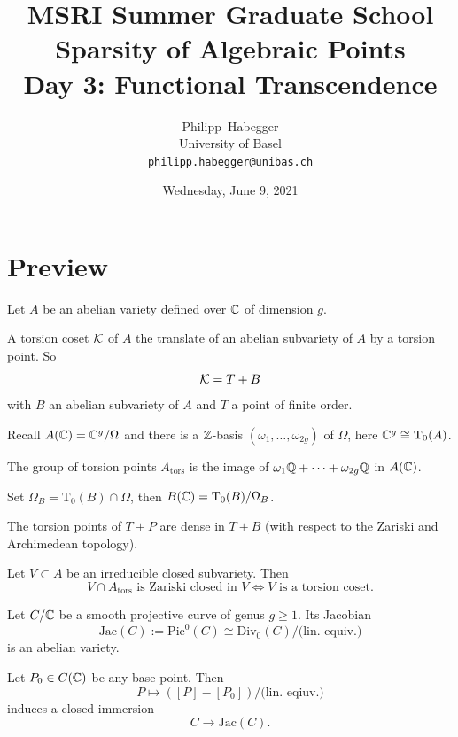 \documentclass{beamer}
\title{MSRI Summer Graduate School \\ Sparsity of Algebraic Points \\
  Day 3: Functional Transcendence}
\author{Philipp~Habegger \\ University of Basel \\ \texttt{philipp.habegger@unibas.ch}}
\date{Wednesday, June 9, 2021}
\begin{document}
\setlength{\abovecaptionskip}{0pt} 
\setlength{\belowcaptionskip}{0pt} 

\renewcommand{\figurename}{Fig.}


\begin{frame}
  \titlepage
\end{frame}
\section{Preview}
\begin{frame}
  Let $A$ be an abelian variety defined over ${\mathbb{C}}$ of dimension $g$. 
  \begin{definition}
    A \alert{torsion coset} ${\mathcal K}$ of $A$
    the translate of an
    abelian subvariety of $A$ by a torsion point. So
    $$ {\mathcal K} = T+B $$
    with $B$ an abelian subvariety of $A$ and $T$ a point of finite order. 
  \end{definition}

  Recall $A({\mathbb{C}}) = {\mathbb{C}}^g / \Omega$ and there is a ${\mathbb{Z}}$-basis
  $(\omega_1,\ldots,\omega_{2g})$ of $\Omega$, here ${\mathbb{C}}^{g} \cong
  \mathrm{T}_0(A)$. 

  The group of torsion points $A_{\mathrm{tors}}$ is the image
  of $\omega_1{\mathbb{Q}}+\cdots+\omega_{2g}{\mathbb{Q}}$  in $A({\mathbb{C}})$.

  Set $\Omega_B = \mathrm{T}_0(B)\cap \Omega$, then $B({\mathbb{C}}) =
  \mathrm{T}_0(B) / \Omega_B$.

  The torsion points of $T+P$ are
  \alert{dense} in $T+B$ (with respect to the Zariski \alert{and}
  Archimedean topology).   
\end{frame}

\begin{frame}
  \begin{theorem}
    Let $V\subset A$ be an irreducible closed subvariety. Then
    \begin{equation*}
      V\cap A_{\mathrm{tors}} \text{ is Zariski closed in $V$}
      \Longleftrightarrow \text{$V$ is a torsion coset.}
    \end{equation*}
  \end{theorem}

  Let $C/{\mathbb{C}}$ be a smooth projective curve of genus $g\ge 1$. Its
  \alert{Jacobian}
  $$\mathrm{Jac}(C):=\mathrm{Pic}^0(C)\cong
  \mathrm{Div}_0(C)/\text{(lin. equiv.)}$$
  is an abelian variety.

  Let $P_0\in C({\mathbb{C}})$ be any base point. Then
  \begin{equation*}
    P\mapsto ([P]-[P_0])/\text{(lin. eqiuv.)} 
  \end{equation*}
  induces a closed immersion
  \begin{equation*}
    C\rightarrow \mathrm{Jac}(C).
  \end{equation*}
\end{frame}  
\end{document}
